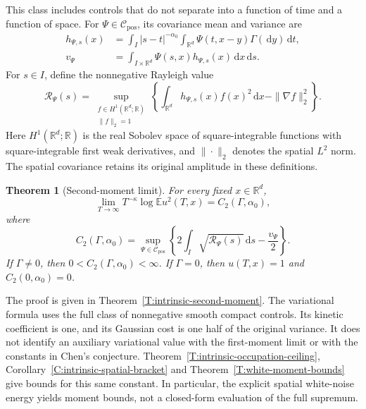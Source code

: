 \documentclass[12pt,oneside,openany]{book}
\numberwithin{equation}{section}
\newtheorem{theorem}{Theorem}[section]
\theoremstyle{nogostyle}
\theoremstyle{definition}
\newcommand{\R}{\mathbb{R}}
\newcommand{\E}{\mathbb{E}}
\newcommand{\ud}{\,\mathrm{d}}
\begin{document}
This class includes controls that do not separate into a function of time and
a function of space. For $\Psi \in \mathcal{C}_{\mathrm{pos}}$, its covariance
mean and variance are
\begin{align}
  h_{\Psi,s}(x)
  &=\int_I|s-t|^{-\alpha_0}
  \int_{\R^d}\Psi(t,x-y)\Gamma(\ud y)\ud t,
  \label{E:intro-control-mean}\\
  v_\Psi
  &=\int_{I\times\R^d}\Psi(s,x)h_{\Psi,s}(x)\ud x\ud s.
  \label{E:intro-control-variance}
\end{align}
For $s \in I$, define the nonnegative Rayleigh value
\begin{equation}\label{E:intro-control-rate}
  \mathcal{R}_\Psi(s)
  =\sup_{\substack{f\in H^1(\R^d;\R)\\\|f\|_2=1}}
  \left\{\int_{\R^d}h_{\Psi,s}(x)f(x)^2\ud x
  -\|\nabla f\|_2^2\right\}.
\end{equation}
Here $H^1(\R^d;\R)$ is the real Sobolev space of square-integrable functions
with square-integrable first weak derivatives, and $\|\cdot\|_2$ denotes the
spatial $L^2$ norm. The spatial
covariance retains its original amplitude in these definitions.

\begin{theorem}[Second-moment limit]\label{T:intro-second-moment}
  \label{G:sharp}
  For every fixed $x \in \R^d$,
  \begin{equation}\label{E:intro-second-moment-limit}
    \lim_{T\to\infty}T^{-\kappa}\log\E u^2(T,x)
    =C_2(\Gamma,\alpha_0),
  \end{equation}
  where
  \begin{equation}\label{E:intro-second-moment-constant}
    C_2(\Gamma,\alpha_0)
    =\sup_{\Psi\in\mathcal{C}_{\mathrm{pos}}}
    \left\{2\int_I\sqrt{\mathcal{R}_\Psi(s)}\ud s
    -\frac{v_\Psi}{2}\right\}.
  \end{equation}
  If $\Gamma \ne 0$, then $0 < C_2(\Gamma,\alpha_0) < \infty$.
  If $\Gamma = 0$, then $u(T,x) = 1$ and $C_2(0,\alpha_0) = 0$.
\end{theorem}

The proof is given in Theorem~\ref{T:intrinsic-second-moment}. The variational
formula uses the full class of nonnegative smooth compact controls. Its kinetic
coefficient is one, and its Gaussian cost is one half of the original variance.
It does not identify an auxiliary variational value with the first-moment limit
or with the constants in Chen's conjecture.
Theorem~\ref{T:intrinsic-occupation-ceiling},
Corollary~\ref{C:intrinsic-spatial-bracket} and
Theorem~\ref{T:white-moment-bounds} give bounds for this same constant. In
particular, the explicit spatial white-noise energy yields moment bounds,
not a closed-form evaluation of the full supremum.
\end{document}
